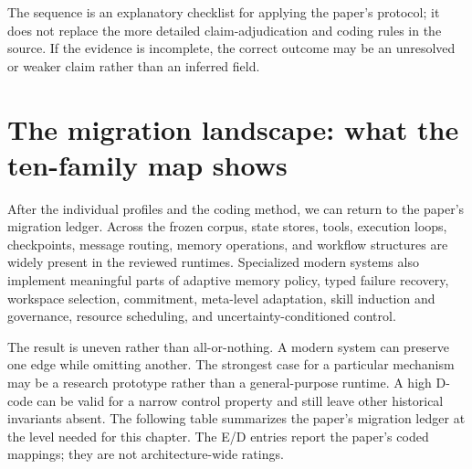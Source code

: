 The sequence is an explanatory checklist for applying the paper's protocol; it does not replace the more detailed claim-adjudication and coding rules in the source. If the evidence is incomplete, the correct outcome may be an unresolved or weaker claim rather than an inferred field.

\section{The migration landscape: what the ten-family map shows}
\label{sec:ch11-migration-landscape}

After the individual profiles and the coding method, we can return to the paper's migration ledger. Across the frozen corpus, state stores, tools, execution loops, checkpoints, message routing, memory operations, and workflow structures are widely present in the reviewed runtimes. Specialized modern systems also implement meaningful parts of adaptive memory policy, typed failure recovery, workspace selection, commitment, meta-level adaptation, skill induction and governance, resource scheduling, and uncertainty-conditioned control.

The result is uneven rather than all-or-nothing. A modern system can preserve one edge while omitting another. The strongest case for a particular mechanism may be a research prototype rather than a general-purpose runtime. A high D-code can be valid for a narrow control property and still leave other historical invariants absent. The following table summarizes the paper's migration ledger at the level needed for this chapter. The E/D entries report the paper's coded mappings; they are not architecture-wide ratings.

